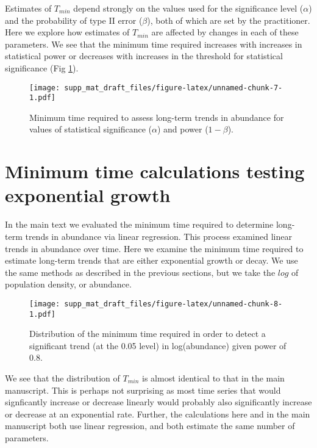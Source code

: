 \documentclass[12pt,]{article}
\begin{document}
Estimates of \(T_{min}\) depend strongly on the values used for the
significance level (\(\alpha\)) and the probability of type II error
(\(\beta\)), both of which are set by the practitioner. Here we explore
how estimates of \(T_{min}\) are affected by changes in each of these
parameters. We see that the minimum time required increases with
increases in statistical power or decreases with increases in the
threshold for statistical significance (Fig
\ref{fig:min_time_vs_alpha_beta}).

\begin{figure}[htbp]
\centering
\texttt{[image: supp\_mat\_draft\_files/figure-latex/unnamed-chunk-7-1.pdf]}
\caption{Minimum time required to assess long-term trends in abundance
for values of statistical significance (\(\alpha\)) and power
(\(1-\beta\)).\label{fig:min_time_vs_alpha_beta}}
\end{figure}

\section{Minimum time calculations testing exponential
growth}\label{minimum-time-calculations-testing-exponential-growth}

In the main text we evaluated the minimum time required to determine
long-term trends in abundance via linear regression. This process
examined linear trends in abundance over time. Here we examine the
minimum time required to estimate long-term trends that are either
exponential growth or decay. We use the same methods as described in the
previous sections, but we take the \(log\) of population density, or
abundance.

\begin{figure}[htbp]
\centering
\texttt{[image: supp\_mat\_draft\_files/figure-latex/unnamed-chunk-8-1.pdf]}
\caption{Distribution of the minimum time required in order to detect a
significant trend (at the 0.05 level) in log(abundance) given power of
0.8.\label{fig:min_time_dist_log_pop}}
\end{figure}

We see that the distribution of \(T_{min}\) is almost identical to that
in the main manuscript. This is perhaps not surprising as most time
series that would signficantly increase or decrease linearly would
probably also significantly increase or decrease at an exponential rate.
Further, the calculations here and in the main manuscript both use
linear regression, and both estimate the same number of parameters.
\end{document}
